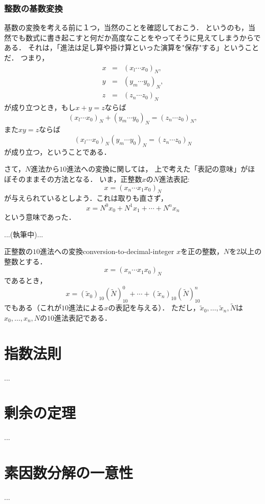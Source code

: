 \documentclass[a5j, uplatex, dvipdfmx]{jsbook}
\begin{document}
\subsection{整数の基数変換}
    基数の変換を考える前に１つ，当然のことを確認しておこう．
    というのも，当然でも数式に書き起こすと何だか高度なことをやってそうに見えてしまうからである．
    それは，「進法は足し算や掛け算といった演算を"保存"する」ということだ．
    つまり，
    \begin{eqnarray*}
        x &=& (x_l \cdots x_0)_N, \\
        y &=& (y_m \cdots y_0)_N, \\
        z &=& (z_n \cdots z_0)_N
    \end{eqnarray*}
    が成り立つとき，もし$x + y = z$ならば
    \begin{equation*}
        (x_l \cdots x_0)_N + (y_m \cdots y_0)_N = (z_n \cdots z_0)_N,
    \end{equation*}
    また$x y = z$ならば
    \begin{equation*}
        (x_l \cdots x_0)_N (y_m \cdots y_0)_N = (z_n \cdots z_0)_N
    \end{equation*}
    が成り立つ，ということである．

    さて，$N$進法から$10$進法への変換に関しては，
    上で考えた「表記の意味」がほぼそのままその方法となる．
    いま，正整数$x$の$N$進法表記:
    \begin{equation*}
        x = (x_n \cdots x_1 x_0)_N
    \end{equation*}
    が与えられているとしよう．これは取りも直さず，
    \begin{equation*}
        x = N^0 x_0 + N^1 x_1 + \cdots + N^n x_n
    \end{equation*}
    という意味であった．

    ...(執筆中)...

    \begin{thm}{正整数の$10$進法への変換}{conversion-to-decimal-integer}
        $x$を正の整数，$N$を$2$以上の整数とする．
        \begin{equation*}
            x = (x_n \cdots x_1 x_0)_N
        \end{equation*}
        であるとき，
        \begin{equation*}
            x = (\tilde{x}_0)_{10}(\tilde{N})_{10}^0 + \cdots + (\tilde{x}_n)_{10}(\tilde{N})_{10}^n
        \end{equation*}
        でもある（これが$10$進法による$x$の表記を与える）．
        ただし，$\tilde{x}_0, \dots, \tilde{x}_n, \tilde{N}$は
        $x_0, \dots, x_n, N$の$10$進法表記である．
    \end{thm}

\appendix
\chapter{指数法則}
    ...

\chapter{剰余の定理}
    ...

\chapter{素因数分解の一意性}
    ...
\end{document}
